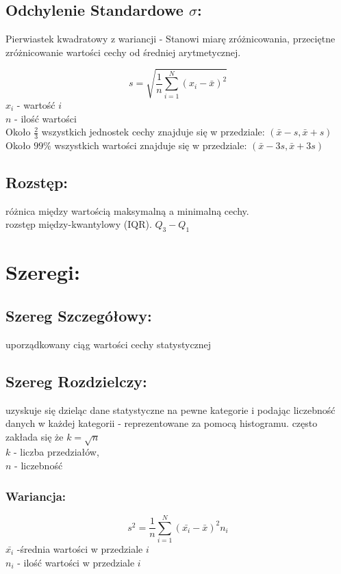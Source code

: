 \documentclass[fleqn]{article}
\begin{document}
\subsection{Odchylenie Standardowe \texorpdfstring{\(\sigma\)}{s}:}
Pierwiastek kwadratowy z wariancji - Stanowi miarę zróżnicowania, przeciętne zróżnicowanie wartości cechy od średniej arytmetycznej.

\[s = \sqrt{\frac{1}{n}\sum_{i=1}^N(x_i-\bar{x})^2}\]
$x_i$ - wartość $i$\\
$n$ - ilość wartości \\
Około $\frac{2}{3}$ wszystkich jednostek cechy znajduje się w przedziale: $(\bar{x}-s,\bar{x}+s)$\\
Około $99\%$ wszystkich wartości znajduje się w przedziale:  $(\bar{x}-3s,\bar{x}+3s)$

\subsection{Rozstęp:}
różnica między wartością maksymalną a minimalną cechy.\\
rozstęp między-kwantylowy (IQR). $Q_3-Q_1$
\pagebreak

\section{Szeregi:}
\subsection{Szereg Szczegółowy:}
uporządkowany ciąg wartości cechy statystycznej

\subsection{Szereg Rozdzielczy:}
uzyskuje się dzieląc dane statystyczne na pewne kategorie i podając liczebność danych w każdej kategorii - reprezentowane za pomocą histogramu.
często zakłada się że $k=\sqrt{n}$\\ $k$ - liczba przedziałów,\\ $n$ - liczebność 
\subsubsection{Wariancja:}
\[s^2 = \frac{1}{n}\sum_{i=1}^N(\bar{x_i}-\bar{x})^2n_i\]
$\bar{x_i}$ -średnia wartości w przedziale $i$\\
$n_i$ - ilość wartości w przedziale $i$
\end{document}

